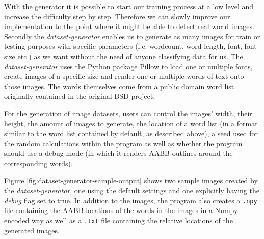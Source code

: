 With the generator it is possible to start our training process at a low level and increase the difficulty step by step. Therefore we can slowly improve our implementation to the point where it might be able to detect real world images. Secondly the \textit{dataset-generator} enables us to generate as many images for train or testing purposes with specific parameters (i.e. wordcount, word length, font, font size etc.) as we want without the need of anyone classifying data for us.
The \textit{dataset-generator} uses the Python package Pillow\cite{PythonPackagePillow} to load one or multiple fonts, create images of a specific size and render one or multiple words of text onto those images.
The words themselves come from a public domain word list originally contained in the original BSD project.\cite{BSDWordlist}

For the generation of image datasets, users can control the images' width, their height, the amount of images to generate, the location of a word list (in a format similar to the word list contained by default, as described above), a seed used for the random calculations within the program as well as whether the program should use a debug mode (in which it renders AABB outlines around the corresponding words).

Figure \ref{fig:dataset-generator-sample-output} shows two sample images created by the \textit{dataset-generator}, one using the default settings and one explicitly having the \textit{debug} flag set to true. 
In addition to the images, the program also creates a \texttt{.npy} file containing the AABB locations of the words in the images in a Numpy-encoded way as well as a \texttt{.txt} file containing the relative locations of the generated images.

